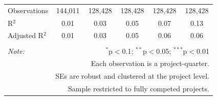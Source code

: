 \documentclass[
]{article}
\begin{document}
\begin{table}[H]
\begin{tabular}{@{\extracolsep{-2pt}}lccccc}
Observations & 144,011 & 128,428 & 128,428 & 128,428 & 128,428 \\ 
R$^{2}$ & 0.01 & 0.03 & 0.05 & 0.07 & 0.13 \\ 
Adjusted R$^{2}$ & 0.01 & 0.03 & 0.05 & 0.06 & 0.06 \\ 
\hline 
\hline \\[-1.8ex] 
\textit{Note:}  & \multicolumn{5}{r}{$^{*}$p$<$0.1; $^{**}$p$<$0.05; $^{***}$p$<$0.01} \\ 
 & \multicolumn{5}{r}{Each observation is a project-quarter.} \\ 
 & \multicolumn{5}{r}{SEs are robust and clustered at the project level.} \\ 
 & \multicolumn{5}{r}{Sample restricted to fully competed projects.} \\ 
\end{tabular} 
\end{table}
\end{document}
